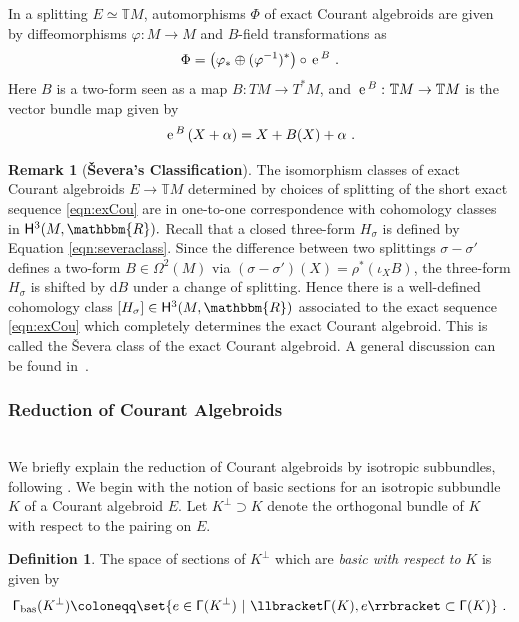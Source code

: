 \documentclass[a4paper, reqno, 11pt]{amsart}
\numberwithin{equation}{section}
\theoremstyle{definition}
\newtheorem{definition}[equation]{Definition}
\newtheorem{remark}[equation]{Remark}
\newcommand{\de}{\mathrm{d}}
\newcommand{\e}{\mathrm{e}}
\newcommand{\IR}{\mathbbm{R}}
\newcommand{\IT}{\mathbb{T}}
\def\e{{\,\rm e}\,}
\theoremstyle{remark}
\begin{document}
In a splitting $E \simeq \IT M$, automorphisms $\Phi$ of exact Courant algebroids are given by diffeomorphisms $\varphi:M\to M$ and $B$-field transformations as $$\Phi = \big(\varphi_* \oplus (\varphi^{-1})^*\big) \circ \e^B \ . $$ Here $B$ is a two-form seen as a map $B \colon TM \to T^*M$, and $\e^{B}\, \colon \IT M \rightarrow \IT M$ is the vector bundle map given by
\begin{align}
\e^{B}\, (X + \alpha) = X + B(X) + \alpha \ .
\end{align}

\begin{remark}[\textbf{\v{S}evera's Classification}\cite{Severa-letters}]
The isomorphism classes of exact Courant algebroids $E \to \IT M $ determined by choices of splitting of the short exact sequence \eqref{eqn:exCou} are in one-to-one correspondence with cohomology classes in ${\sf H}^3( M,\IR).$  
Recall that a closed three-form $H_\sigma$ is defined by Equation \eqref{eqn:severaclass}.
Since the difference between two splittings $\sigma-\sigma'$ defines a two-form $B\in \mathsf{\Omega}^2(M)$ via $(\sigma-\sigma')(X) = \rho^*(\iota_X B)$, the three-form $H_\sigma$ is shifted by $\de B$ under a change of splitting. Hence there is a well-defined cohomology class $[H_\sigma]\in {\sf H}^3(M,\IR)$ associated to the exact sequence \eqref{eqn:exCou} which completely determines the exact Courant algebroid. This is called the \v{S}evera class of the exact Courant algebroid. A general discussion can be found in~\cite[Section 2.2]{Garcia-Fernandez:2020ope}.
\end{remark}

\medskip

\subsubsection{Reduction of Courant Algebroids}~\\[5pt]
 We briefly explain the reduction of Courant algebroids by isotropic subbundles, following \cite{Zambon2008reduction}. We begin with the notion of basic sections for an isotropic subbundle $K$ of a Courant algebroid $E$. Let $K^\perp\supset K$ denote the orthogonal bundle of $K$ with respect to the pairing on $E$.

\begin{definition}
    The space of sections of $K^\perp$ which are \emph{basic with respect to} $K$ is given by
    \begin{align}
        \mathsf{\Gamma}_{\text{bas}}(K^\perp) \coloneqq \set{e \in \mathsf{\Gamma}(K^\perp) \ \vert \ \llbracket \mathsf{\Gamma}(K) ,e \rrbracket \subset \mathsf{\Gamma}(K)} \ .
    \end{align}
\end{definition}
 
\end{document}

